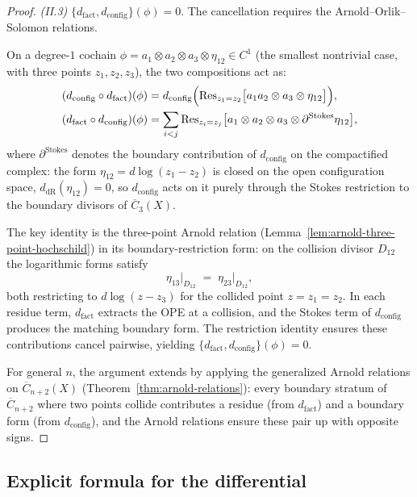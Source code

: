 \begin{proof}
\emph{(II.3)} $\{d_{\text{fact}}, d_{\text{config}}\}(\phi) = 0$.
The cancellation requires the
Arnold--Orlik--Solomon relations.

On a degree-$1$ cochain
$\phi = a_1 \otimes a_2 \otimes a_3 \otimes
\eta_{12} \in C^1$ (the smallest nontrivial case,
with three points $z_1, z_2, z_3$), the two compositions act
as:
\begin{align*}
(d_{\text{config}} \circ d_{\text{fact}})(\phi)
&= d_{\text{config}}\Bigl(
 \mathrm{Res}_{z_1 = z_2}\bigl[a_1 a_2 \otimes a_3
 \otimes \eta_{12}\bigr] \Bigr), \\
(d_{\text{fact}} \circ d_{\text{config}})(\phi)
&= \sum_{i<j}
 \mathrm{Res}_{z_i = z_j}\bigl[a_1 \otimes a_2 \otimes a_3
 \otimes \partial^{\mathrm{Stokes}}\eta_{12}\bigr],
\end{align*}
where $\partial^{\mathrm{Stokes}}$ denotes the boundary
contribution of $d_{\text{config}}$ on the compactified
complex: the form $\eta_{12} = d\log(z_1 - z_2)$ is closed on
the open configuration space, $d_{\mathrm{dR}}(\eta_{12}) = 0$,
so $d_{\text{config}}$ acts on it purely through the Stokes
restriction to the boundary divisors of
$\overline{C}_3(X)$.

The key identity is the three-point Arnold relation
(Lemma~\ref{lem:arnold-three-point-hochschild}) in its
boundary-restriction form: on the collision divisor $D_{12}$
the logarithmic forms satisfy
\[
\eta_{13}\big|_{D_{12}}
\;=\;
\eta_{23}\big|_{D_{12}},
\]
both restricting to $d\log(z - z_3)$ for the collided point
$z = z_1 = z_2$.
In each residue term, $d_{\text{fact}}$ extracts the OPE
at a collision, and the Stokes term of $d_{\text{config}}$
produces the matching boundary form. The restriction identity
ensures these contributions
cancel pairwise, yielding
$\{d_{\text{fact}}, d_{\text{config}}\}(\phi) = 0$.

For general $n$, the argument extends by applying the
generalized Arnold relations on $\overline{C}_{n+2}(X)$
(Theorem~\ref{thm:arnold-relations}): every boundary
stratum of $\overline{C}_{n+2}$ where two points collide
contributes a residue (from $d_{\text{fact}}$) and a
boundary form (from $d_{\text{config}}$), and the
Arnold relations ensure these pair up with opposite signs.
\end{proof}

\subsection{Explicit formula for the differential}

